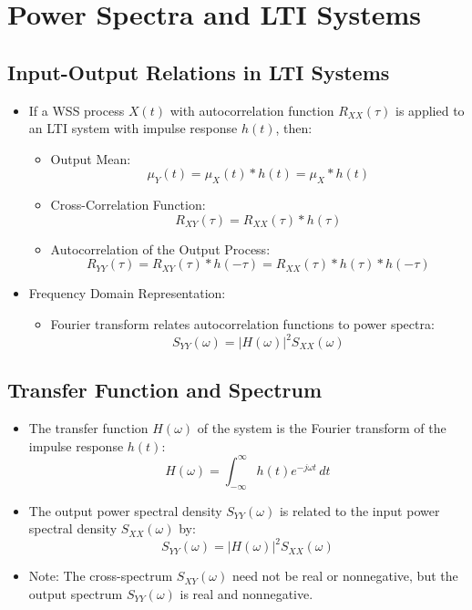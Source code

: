 \documentclass[12pt]{article}
\begin{document}
\section{Power Spectra and LTI Systems}

\subsection{Input-Output Relations in LTI Systems}
\begin{itemize}
    \item If a WSS process \( X(t) \) with autocorrelation function \( R_{XX}(\tau) \) is applied to an LTI system with impulse response \( h(t) \), then:
    \begin{itemize}
        \item Output Mean:
        \[
        \mu_Y(t) = \mu_X(t) * h(t) = \mu_X * h(t)
        \]
        \item Cross-Correlation Function:
        \[
        R_{XY}(\tau) = R_{XX}(\tau) * h(\tau)
        \]
        \item Autocorrelation of the Output Process:
        \[
        R_{YY}(\tau) = R_{XY}(\tau) * h(-\tau) = R_{XX}(\tau) * h(\tau) * h(-\tau)
        \]
    \end{itemize}
    \item Frequency Domain Representation:
    \begin{itemize}
        \item Fourier transform relates autocorrelation functions to power spectra:
        \[
        S_{YY}(\omega) = |H(\omega)|^2 S_{XX}(\omega)
        \]
    \end{itemize}
\end{itemize}

\subsection{Transfer Function and Spectrum}
\begin{itemize}
    \item The transfer function \( H(\omega) \) of the system is the Fourier transform of the impulse response \( h(t) \):
    \[
    H(\omega) = \int_{-\infty}^{\infty} h(t) e^{-j\omega t} \, dt
    \]
    \item The output power spectral density \( S_{YY}(\omega) \) is related to the input power spectral density \( S_{XX}(\omega) \) by:
    \[
    S_{YY}(\omega) = |H(\omega)|^2 S_{XX}(\omega)
    \]
    \item Note: The cross-spectrum \( S_{XY}(\omega) \) need not be real or nonnegative, but the output spectrum \( S_{YY}(\omega) \) is real and nonnegative.
\end{itemize}
\end{document}
